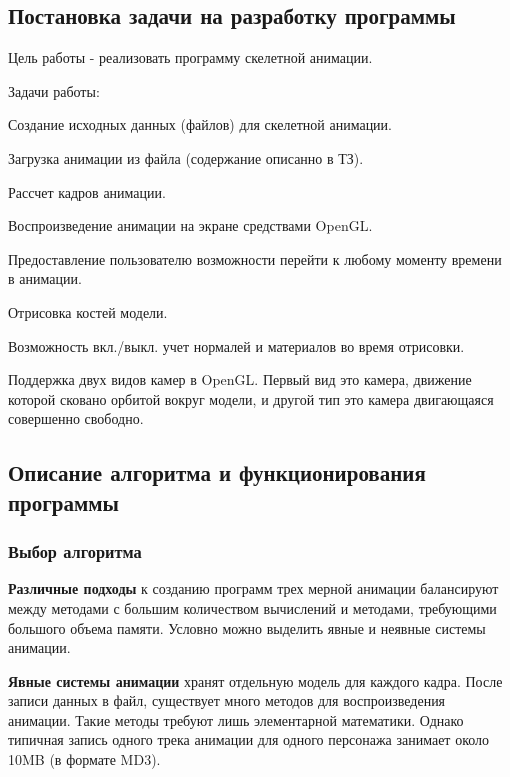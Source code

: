 \subsection{Постановка задачи на разработку программы}
    Цель работы - реализовать программу скелетной анимации.

\bigskip
Задачи работы:

\smallskip
\begin{my_enumerate}
\item Создание исходных данных (файлов) для скелетной анимации.
\item Загрузка анимации из файла (содержание описанно в ТЗ).
\item Рассчет кадров анимации.
\item Воспроизведение анимации на экране средствами OpenGL.
\item Предоставление пользователю возможности перейти к любому моменту времени в анимации.
\item Отрисовка костей модели.
\item Возможность вкл./выкл. учет нормалей и материалов во время отрисовки.
\item Поддержка двух видов камер в OpenGL. Первый вид это камера, движение которой сковано орбитой вокруг модели, и другой тип это камера двигающаяся совершенно свободно.
\end{my_enumerate}


\subsection{Описание алгоритма и функционирования программы}


\subsubsection{Выбор алгоритма}

\textbf{Различные подходы}
к созданию программ трех мерной анимации балансируют между методами с большим количеством вычислений и методами, требующими большого объема памяти. Условно можно выделить явные и неявные системы анимации.

\textbf{Явные системы анимации} хранят отдельную модель для каждого кадра.
После записи данных в файл, существует много методов для воспроизведения анимации.
Такие методы требуют лишь элементарной математики.
Однако типичная запись одного трека анимации для одного персонажа занимает около 10MB (в формате MD3).

